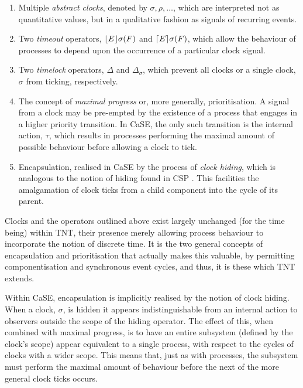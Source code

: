 \documentclass[orivec]{llncs}
\begin{document}
\begin{enumerate}
\item Multiple \emph{abstract clocks}, denoted by $\sigma, \rho, \dots$,
      which are interpreted not as quantitative values, but in a
      qualitative fashion as signals of recurring events.
\item Two \emph{timeout} operators, $\lfloor{E}\rfloor {\sigma} ({F})$ and
      $\lceil{E}\rceil {\sigma} ({F})$, which allow the behaviour of
      processes to depend upon the occurrence of a particular clock
      signal.
\item Two \emph{timelock} operators, $\Delta$ and $\Delta_{\sigma}$,
      which prevent all clocks \AJH{(}{,}or a single
      clock, $\sigma$\AJH{)}{,} from ticking, respectively.
\item The concept of \emph{maximal progress} or, more generally,
      prioritisation.  A signal from a clock may be pre-empted by the
      existence of a process that engages in a higher priority
      transition.  In CaSE, the only such transition is the internal action,
      $\tau$, which results in processes performing the maximal amount
      of possible behaviour before allowing a clock to tick.
\item Encapsulation, realised in CaSE by the process of \emph{clock
      hiding}, which is analogous to the notion of hiding found in
      CSP \cite{hoare:csp78}.  This facilities the amalgamation of clock ticks
      from a child component into the cycle of its parent.
\end{enumerate}

Clocks and the operators outlined above exist largely unchanged (for the
time being) within TNT, their presence merely allowing process behaviour
to incorporate the notion of discrete time.  It is the two general
concepts of encapsulation and prioritisation that actually makes this
valuable, by permitting componentisation and synchronous event cycles,
and thus, it is these which TNT extends.

Within CaSE, encapsulation is implicitly realised by the notion of clock
hiding.  When a clock, $\sigma$, is hidden it appears indistinguishable
from an internal action to observers outside the scope of the hiding
operator.  The effect of this, when combined with maximal progress, is
to have an entire subsystem (defined by the clock's scope) appear
equivalent to a single process, with respect to the cycles of clocks
with a wider scope.  This means that, just as with processes, the
subsystem must perform the maximal amount of behaviour before the next
of the more general clock ticks occurs.
\end{document}
